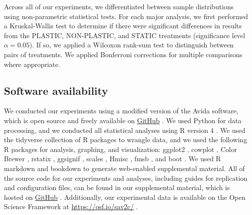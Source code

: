 Across all of our experiments, we differentiated between sample distributions using non-parametric statistical tests.
For each major analysis, we first performed a Kruskal-Wallis test \citep{kruskal_use_1952} to 
determine if there were significant differences in results from the PLASTIC, NON-PLASTIC, and STATIC treatments (significance level $\alpha=0.05$).
If so, we applied a Wilcoxon rank-sum test \citep{kotz_individual_1992} to distinguish between pairs of treatments.
We applied Bonferroni corrections for multiple comparisons \citep{rice_analyzing_1989} where appropriate.

\vspace{5mm}
\subsection{Software availability}

We conducted our experiments using a modified version of the Avida software, which is open source and freely available on \href{https://github.com/amlalejini/evolutionary-consequences-of-plasticity}{GitHub} \citep{supplemental_material}.
We used Python for data processing, and we conducted all statistical analyses using R version 4 \citep{r_core_team_r_v4}.
We used the tidyverse collection of R packages \citep{r_tidyverse_2019} to wrangle data, and we used the following R packages for analysis, graphing, and visualization: 
ggplot2 \citep{R-ggplot2}, 
cowplot \citep{R-cowplot}, 
Color Brewer \citep{harrower_colorbrewerorg_2003,R-Brewer_2014}, 
rstatix \citep{R-rstatix},
ggsignif \citep{R-ggsignif},
scales \citep{R-scales},
Hmisc \citep{R-Hmisc}, 
fmsb \citep{R-fmsb}, 
and boot \citep{R-boot}.
We used R markdown \citep{rmarkdown} and bookdown \citep{R-bookdown} to generate web-enabled supplemental material.
All of the source code for our experiments and analyses, including guides for replication and configuration files, can be found in our supplemental material, which is hosted on \href{https://github.com/amlalejini/evolutionary-consequences-of-plasticity}{GitHub} \citep{supplemental_material}.
Additionally, our experimental data is available on the Open Science Framework at \url{https://osf.io/sav2c/} \citep{osf_data}.